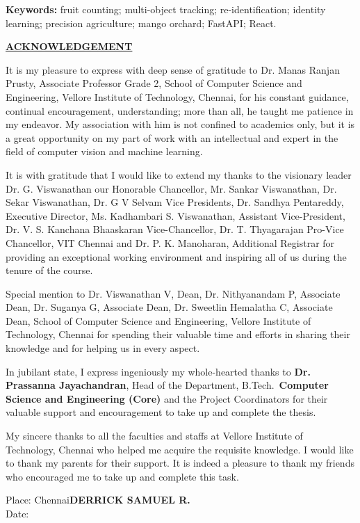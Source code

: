 \documentclass[12pt,a4paper]{report}
\newcommand{\add}[1]{#1}
\newcommand{\fronthead}[1]{%
  \begin{center}\underline{\textbf{\fontsize{14}{17}\selectfont #1}}\end{center}\vspace{6pt}}
\newcommand{\candname}{DERRICK SAMUEL R.}
\newcommand{\guidename}{Dr. Manas Ranjan Prusty}
\newcommand{\guidedesig}{Associate Professor Grade 2}
\newcommand{\hodname}{Dr. Prassanna Jayachandran}
\newcommand{\specname}{Core}
\begin{document}
\vspace{6pt}
\noindent\textbf{Keywords:} \add{fruit counting; multi-object tracking; re-identification; identity learning; precision agriculture; mango orchard; FastAPI; React.}

\clearpage
\fronthead{ACKNOWLEDGEMENT}
It is my pleasure to express with deep sense of gratitude to \guidename, \guidedesig, School of Computer Science and Engineering, Vellore Institute of Technology, Chennai, for his constant guidance, continual encouragement, understanding; more than all, he taught me patience in my endeavor. My association with him is not confined to academics only, but it is a great opportunity on my part of work with an intellectual and expert in the field of \add{computer vision and machine learning}.

It is with gratitude that I would like to extend my thanks to the visionary leader Dr. G. Viswanathan our Honorable Chancellor, Mr. Sankar Viswanathan, Dr. Sekar Viswanathan, Dr. G V Selvam Vice Presidents, Dr. Sandhya Pentareddy, Executive Director, Ms. Kadhambari S. Viswanathan, Assistant Vice-President, Dr. V. S. Kanchana Bhaaskaran Vice-Chancellor, Dr. T. Thyagarajan Pro-Vice Chancellor, VIT Chennai and Dr. P. K. Manoharan, Additional Registrar for providing an exceptional working environment and inspiring all of us during the tenure of the course.

Special mention to Dr. Viswanathan V, Dean, Dr. Nithyanandam P, Associate Dean, Dr. Suganya G, Associate Dean, Dr. Sweetlin Hemalatha C, Associate Dean, School of Computer Science and Engineering, Vellore Institute of Technology, Chennai for spending their valuable time and efforts in sharing their knowledge and for helping us in every aspect.

In jubilant state, I express ingeniously my whole-hearted thanks to \textbf{\hodname}, Head of the Department, B.Tech.\ \textbf{Computer Science and Engineering (\specname)} and the Project Coordinators for their valuable support and encouragement to take up and complete the thesis.

My sincere thanks to all the faculties and staffs at Vellore Institute of Technology, Chennai who helped me acquire the requisite knowledge. I would like to thank my parents for their support. It is indeed a pleasure to thank my friends who encouraged me to take up and complete this task.

\vspace{18pt}
\noindent Place: Chennai\hfill\textbf{\candname}\\
Date:
\end{document}
